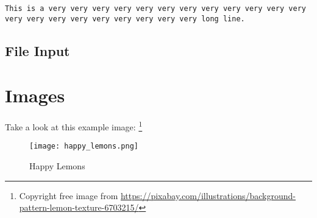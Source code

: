 \documentclass[10pt]{article}
\begin{document}
\begin{lstlisting}[caption=Very long line]
This is a very very very very very very very very very very very very very very very very very very very very very long line.
\end{lstlisting}

\subsection{File Input}


\section{Images}
Take a look at this example image: \footnote{Copyright free image from \url{https://pixabay.com/illustrations/background-pattern-lemon-texture-6703215/}}
\begin{figure}[h!t]
  \centering
  \texttt{[image: happy\_lemons.png]}
  \caption{Happy Lemons}
  \label{fig:happylemons}
\end{figure}
\end{document}

